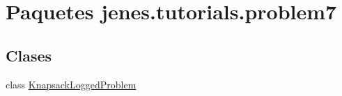 \hypertarget{namespacejenes_1_1tutorials_1_1problem7}{\section{Paquetes jenes.\-tutorials.\-problem7}
\label{namespacejenes_1_1tutorials_1_1problem7}
}
\subsection*{Clases}
\begin{DoxyCompactItemize}
\item 
class \hyperlink{classjenes_1_1tutorials_1_1problem7_1_1_knapsack_logged_problem}{Knapsack\-Logged\-Problem}
\end{DoxyCompactItemize}
